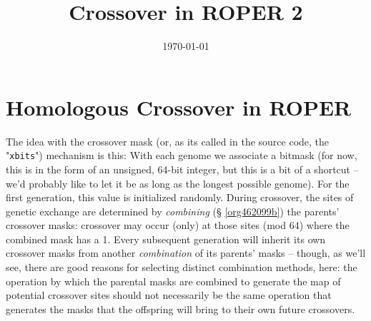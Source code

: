 \documentclass[11pt]{article}
\date{\today}
\title{Crossover in ROPER 2}
\begin{document}
\maketitle
\tableofcontents


\section{Homologous Crossover in ROPER}
\label{sec:org5a7519b}
The idea with the crossover mask (or, as its called in the source code, the
"\texttt{xbits}") mechanism is this: With each genome we associate a bitmask (for now,
this is in the form of an unsigned, 64-bit integer, but this is a bit of a
shortcut -- we'd probably like to let it be as long as the longest possible
genome). For the first generation, this value is initialized randomly. During
crossover, the sites of genetic exchange are determined by \emph{combining} (\S
\ref{org462099b}) the parents' crossover masks: crossover may occur (only) at
those sites (mod 64) where the combined mask has a 1. Every subsequent generation
will inherit its own crossover masks from another \emph{combination} of its parents'
masks -- though, as we'll see, there are good reasons for selecting distinct
combination methods, here: the operation by which the parental masks are combined
to generate the map of potential crossover sites should not necessarily be the
same operation that generates the masks that the offspring will bring to their
own future crossovers.
\end{document}
